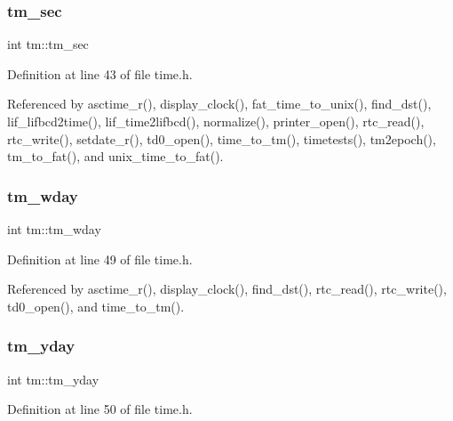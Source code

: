 \mbox{\label{structtm_a4d098a9a5c03a00b2ee61e10851de81e}} 
\subsubsection{\texorpdfstring{tm\+\_\+sec}{tm\_sec}}
{\footnotesize\ttfamily int tm\+::tm\+\_\+sec}



Definition at line 43 of file time.\+h.



Referenced by asctime\+\_\+r(), display\+\_\+clock(), fat\+\_\+time\+\_\+to\+\_\+unix(), find\+\_\+dst(), lif\+\_\+lifbcd2time(), lif\+\_\+time2lifbcd(), normalize(), printer\+\_\+open(), rtc\+\_\+read(), rtc\+\_\+write(), setdate\+\_\+r(), td0\+\_\+open(), time\+\_\+to\+\_\+tm(), timetests(), tm2epoch(), tm\+\_\+to\+\_\+fat(), and unix\+\_\+time\+\_\+to\+\_\+fat().

\mbox{\label{structtm_afe81a8c46f1c693c43f259b288859f4f}} 
\subsubsection{\texorpdfstring{tm\+\_\+wday}{tm\_wday}}
{\footnotesize\ttfamily int tm\+::tm\+\_\+wday}



Definition at line 49 of file time.\+h.



Referenced by asctime\+\_\+r(), display\+\_\+clock(), find\+\_\+dst(), rtc\+\_\+read(), rtc\+\_\+write(), td0\+\_\+open(), and time\+\_\+to\+\_\+tm().

\mbox{\label{structtm_a93a0ba77cc23796df84405dcbcc57eb1}} 
\subsubsection{\texorpdfstring{tm\+\_\+yday}{tm\_yday}}
{\footnotesize\ttfamily int tm\+::tm\+\_\+yday}



Definition at line 50 of file time.\+h.



